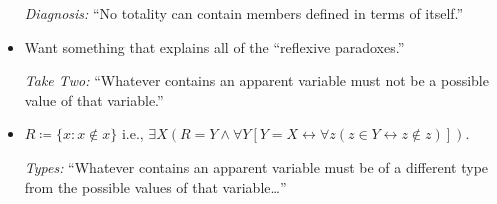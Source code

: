 \documentclass[a4paper, 11pt]{article} %
\newcommand{\set}[1]{\lbrace#1\rbrace} %
\begin{document}
  \begin{itemize}
    \item[\it Diagnosis:] ``No totality can contain members defined in terms of itself.'' 
      \item Want something that explains all of the ``reflexive paradoxes.''
    \item[\it Take Two:] ``Whatever contains an apparent variable must not be a possible value of that variable.''
      \item $R \coloneq \set{x : x \notin x}$ i.e., $\exists X(R = Y \wedge \forall Y[Y = X \leftrightarrow \forall z(z\in Y \leftrightarrow z \notin z)])$.
    \item[\it Types:] ``Whatever contains an apparent variable must be of a different type from the possible values of that variable\ldots'' 
  \end{itemize}
\end{document}
